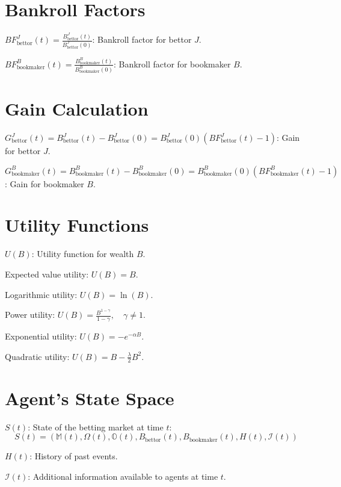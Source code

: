 \section{Bankroll Factors}

\item \( BF_{\text{bettor}}^J(t) = \frac{B_{\text{bettor}}^J(t)}{B_{\text{bettor}}^J(0)} \): Bankroll factor for bettor \( J \).
\item \( BF_{\text{bookmaker}}^B(t) = \frac{B_{\text{bookmaker}}^B(t)}{B_{\text{bookmaker}}^B(0)} \): Bankroll factor for bookmaker \( B \).

\section{Gain Calculation}

\item \( G_{\text{bettor}}^J(t) = B_{\text{bettor}}^J(t) - B_{\text{bettor}}^J(0) = B_{\text{bettor}}^J(0) \left( BF_{\text{bettor}}^J(t) - 1 \right) \): Gain for bettor \( J \).
\item \( G_{\text{bookmaker}}^B(t) = B_{\text{bookmaker}}^B(t) - B_{\text{bookmaker}}^B(0) = B_{\text{bookmaker}}^B(0) \left( BF_{\text{bookmaker}}^B(t) - 1 \right) \): Gain for bookmaker \( B \).

\section{Utility Functions}

\item \( U(B) \): Utility function for wealth \( B \).
\item Expected value utility: \( U(B) = B \).
\item Logarithmic utility: \( U(B) = \ln(B) \).
\item Power utility: \( U(B) = \frac{B^{1 - \gamma}}{1 - \gamma}, \quad \gamma \neq 1 \).
\item Exponential utility: \( U(B) = -e^{-\alpha B} \).
\item Quadratic utility: \( U(B) = B - \frac{\lambda}{2} B^2 \).

\section{Agent's State Space}

\item \( S(t) \): State of the betting market at time \( t \):
  \[
  S(t) = \left( \mathbb{M}(t), \Omega(t), \mathbb{O}(t), B_{\text{bettor}}(t), B_{\text{bookmaker}}(t), H(t), \mathcal{I}(t) \right)
  \]
  \item \( H(t) \): History of past events.
  \item \( \mathcal{I}(t) \): Additional information available to agents at time \( t \).

